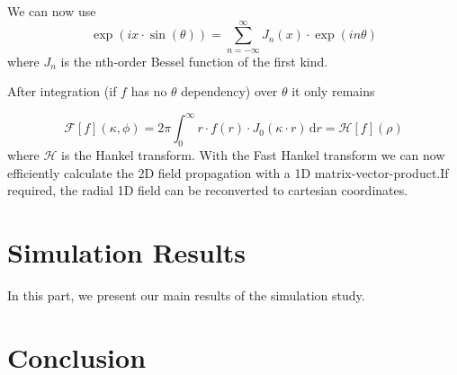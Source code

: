 \documentclass[a4paper,12pt]{article}
\begin{document}
We can now use
\begin{equation}
\exp(i x \cdot \sin(\theta)) = \sum_{n=-\infty}^{\infty} J_n(x) \cdot \exp(i n \theta)
\end{equation}
where $J_n$ is the nth-order Bessel function of the first kind.

After integration (if $f$ has no $\theta$ dependency) over $\theta$ it only remains

\begin{equation}
\mathcal{F}[f](\kappa, \phi) = 2\pi \int_{0}^{\infty} r \cdot f(r) \cdot J_0(\kappa \cdot r) \, \mathrm{d}r = \mathcal{H}[f](\rho)
\end{equation}
where $\mathcal{H}$ is the Hankel transform.
With the Fast Hankel transform \cite{Guizar-Sicairos_Gutiérrez-Vega_2004} we can now efficiently calculate the 2D field propagation with a 1D matrix-vector-product.If required, the radial 1D field can be reconverted to cartesian coordinates. 

\section{Simulation Results}
In this part, we present our main results of the simulation study. 
\label{sec:sim}

\section{Conclusion}


\printbibliography
\end{document}
